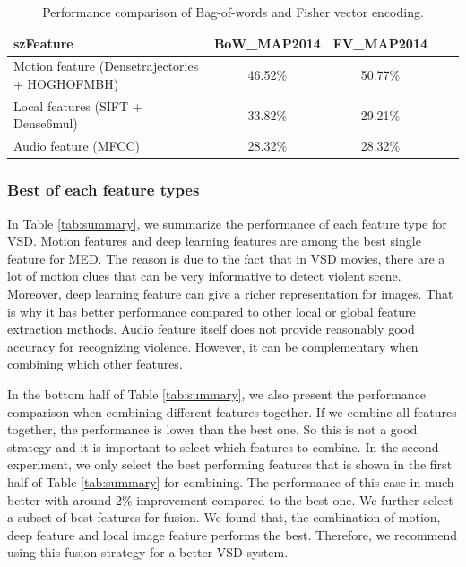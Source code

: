 \documentclass[twocolumn]{bmcart}%
\begin{document}
\begin{table}[htbp]
	\centering
	\caption{Performance comparison of Bag-of-words and Fisher vector encoding.}
	\begin{tabular}{lcccc}
		\hline
		szFeature & BoW\_MAP2014 & FV\_MAP2014 \\ \hline
		Motion feature (Densetrajectories + HOGHOFMBH) & 46.52\% & 50.77\% \\
		Local features (SIFT + Dense6mul) & 33.82\% & 29.21\% \\
		Audio feature (MFCC) & 28.32\% & 28.32\% \\ \hline
	\end{tabular}%
	\label{tab:bow_fv}%
\end{table}%

\subsubsection{Best of each feature types}
In Table \ref{tab:summary}, we summarize the performance of each feature type for VSD. Motion features and deep learning features are among the best single feature for MED. The reason is due to the fact that in VSD movies, there are a lot of motion clues that can be very informative to detect violent scene. Moreover, deep learning feature can give a richer representation for images. That is why it has better performance compared to other local or global feature extraction methods. Audio feature itself does not provide reasonably good accuracy for recognizing violence. However, it can be complementary when combining which other features. 

In the bottom half of Table \ref{tab:summary}, we also present the performance comparison when combining different features together. If we combine all features together, the performance is lower than the best one. So this is not a good strategy and it is important to select which features to combine. In the second experiment, we only select the best performing features that is shown in the first half of Table \ref{tab:summary} for combining. The performance of this case in much better with around 2\% improvement compared to the best one. We further select a subset of best features for fusion. We found that, the combination of motion, deep feature and local image feature performs the best. Therefore, we recommend using this fusion strategy for a better VSD system.
\end{document}

